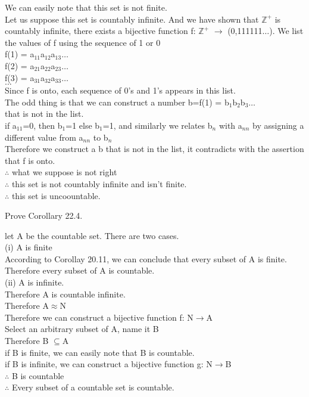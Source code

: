 \documentclass[11pt, a4paper, UTF8]{ctexart}
\begin{document}
\begin{solution}
We can easily note that this set is not finite.\\
Let us suppose this set is countably infinite. And we have shown that $\mathbb{Z}^+$ is countably infinite, there exists a bijective function f: $\mathbb{Z}^+$ $\rightarrow$ (0,111111$\dots$). We list the values of f using the sequence of 1 or 0\\
f(1) = a$_{11}$a$_{12}$a$_{13}$$\dots$\\
f(2) = a$_{21}$a$_{22}$a$_{23}$$\dots$\\
f(3) = a$_{31}$a$_{32}$a$_{33}$$\dots$\\
$\dots$\\
Since f is onto, each sequence of 0's and 1's appears in this list.\\
The odd thing is that we can construct a number b=f(1) = b$_{1}$b$_{2}$b$_{3}$$\dots$\\ that is not in the list.\\
if a$_{11}$=0, then b$_{1}$=1 else b$_{1}$=1, and similarly we relates b$_{n}$ with a$_{nn}$ by assigning a different value from a$_{nn}$ to b$_{n}$\\
Therefore we construct a b that is not in the list, it contradicts with the assertion that f is onto.\\
$\therefore$ what we suppose is not right\\
$\therefore$ this set is not countably infinite and isn't finite.\\
$\therefore$ this set is uncoountable.
\end{solution}



\begin{problem}[UD:22.6]
Prove Corollary 22.4.
\end{problem}
\begin{solution}
let A be the countable set. There are two cases.\\
(i) A is finite\\
According to Corollay 20.11, we can conclude that every subset of A is finite.\\
Therefore every subset of A is countable.\\
(ii) A is infinite.\\
Therefore A is countable infinite.\\
Therefore A$\approx$N\\
Therefore we can construct a bijective function f: N$\rightarrow$A\\
Select an arbitrary subset of A, name it B\\
Therefore B $\subseteq$A\\
if B is finite, we can easily note that B is countable.\\
if B is infinite, we can construct a bijective function g: N$\rightarrow$B\\
$\therefore$ B is countable\\
$\therefore$ Every subset of a countable set is countable.
\end{solution}
\end{document}
